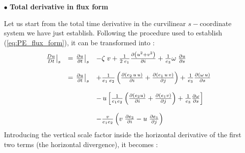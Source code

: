 \documentclass[../main/NEMO_manual]{subfiles}
\begin{document}
$\bullet$ \textbf{Total derivative in flux form}

Let us start from the total time derivative in the curvilinear $s-$coordinate system we have just establish.
Following the procedure used to establish (\autoref{eq:PE_flux_form}), it can be transformed into :
\begin{align*}
  {
  \begin{array}{*{20}l}
    \left. \frac{D u}{D t} \right|_s  &= \left. {\frac{\partial u }{\partial t}} \right|_s
    & -  \zeta \;v
      + \frac{1}{2\;e_1 } \frac{\partial \left( {u^2+v^2} \right)}{\partial i}
      + \frac{1}{e_3} \omega \;\frac{\partial u}{\partial s} \\ \\
                                      &= \left. {\frac{\partial u }{\partial t}} \right|_s
    &+\frac{1}{e_1\;e_2}  \left(    \frac{\partial \left( {e_2 \,u\,u } \right)}{\partial i}
      + \frac{\partial \left( {e_1 \,u\,v } \right)}{\partial j}     \right)
      + \frac{1}{e_3 } \frac{\partial \left( {\omega\,u} \right)}{\partial s} \\ \\
                                      &&- \,u \left[     \frac{1}{e_1 e_2 } \left(    \frac{\partial(e_2 u)}{\partial i}
                                         + \frac{\partial(e_1 v)}{\partial j}    \right)
                                         + \frac{1}{e_3}        \frac{\partial \omega}{\partial s}                       \right] \\ \\
                                      &&- \frac{v}{e_1 e_2 }\left(    v	\;\frac{\partial e_2 }{\partial i}
                                         -u	\;\frac{\partial e_1 }{\partial j} 	\right) \\
  \end{array}
  }
\end{align*}
%
Introducing the vertical scale factor inside the horizontal derivative of the first two terms 
(\ie the horizontal divergence), it becomes :
\end{document}
